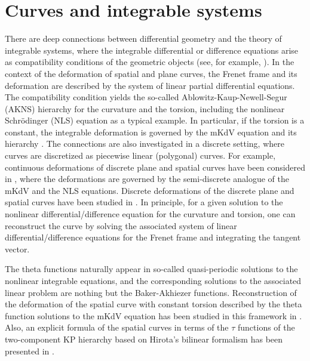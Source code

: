 \documentclass[10pt,leqno]{amsart}
\numberwithin{equation}{section}
\begin{document}
\section{Curves and integrable systems}\label{sec:integrable}
There are deep connections between differential geometry and the theory of integrable systems, where 
the integrable differential or difference equations arise as compatibility conditions of the geometric objects (see, for example, \cite{rogers_schief_2002}). In the context of
the deformation of spatial and plane curves, the Frenet frame and its deformation are described by the system of 
linear partial differential equations. 
The compatibility condition yields the so-called Ablowitz-Kaup-Newell-Segur (AKNS) hierarchy
for the curvature and the torsion, including the nonlinear Schr\"odinger (NLS) equation as a typical example. 
In particular, if the torsion is a constant, the integrable deformation is governed by the mKdV equation and its hierarchy \cite{hasimoto1972soliton,Lamb,rogers_schief_2002}. 
The connections are also investigated in a discrete setting, where curves are discretized as piecewise linear (polygonal) curves. 
For example, continuous deformations of discrete plane and 
spatial curves have been considered in \cite{doliwa1995integrable}, where the deformations are governed by the semi-discrete analogue of 
the mKdV and the NLS equations. Discrete deformations of the discrete plane and spatial curves have been studied in \cite{IKMO:DmKdVsG}.
In principle, for a given solution to the nonlinear differential/difference equation for the curvature and torsion,
one can reconstruct the curve by solving the associated system of linear differential/difference equations for the Frenet frame 
and integrating the tangent vector. 

The theta functions naturally appear in so-called quasi-periodic solutions to the nonlinear integrable equations, and the corresponding solutions to the associated linear problem are nothing but the Baker-Akhiezer functions. Reconstruction of the deformation of the spatial curve with constant torsion described by the theta function solutions to the mKdV equation has been studied in this framework in \cite{calini1998backlund,langer1984knotted}. Also, an explicit formula of the spatial curves in terms of the $\tau$ functions of the two-component KP hierarchy based on Hirota's bilinear formalism has been presented in \cite{HIKMO:DLIE}.
\end{document}
